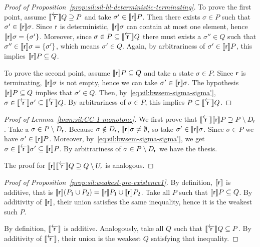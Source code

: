 \begin{proof}[Proof of Proposition~\ref{prop:sil:sil-hl-deterministic-terminating}]
	To prove the first point, assume $\llbracket\overleftarrow{\mathsf{r}}\rrbracket Q \supseteq P$ and take $\sigma' \in \llbracket\mathsf{r}\rrbracket P$. Then there exists $\sigma \in P$ such that $\sigma' \in \llbracket\mathsf{r}\rrbracket \sigma$. Since $\mathsf{r}$ is deterministic, $\llbracket\mathsf{r}\rrbracket \sigma$ can contain at most one element, hence $\llbracket\mathsf{r}\rrbracket \sigma = \{ \sigma' \}$. Moreover, since $\sigma \in P \subseteq \llbracket\overleftarrow{\mathsf{r}}\rrbracket Q$ there must exists a $\sigma'' \in Q$ such that $\sigma'' \in \llbracket\mathsf{r}\rrbracket \sigma = \{ \sigma' \}$, which means $\sigma' \in Q$. Again, by arbitrariness of $\sigma' \in \llbracket\mathsf{r}\rrbracket P$, this implies $\llbracket\mathsf{r}\rrbracket P \subseteq Q$.

	To prove the second point, assume $\llbracket\mathsf{r}\rrbracket P \subseteq Q$ and take a state $\sigma \in P$. Since $\mathsf{r}$ is terminating, $\llbracket\mathsf{r}\rrbracket \sigma$ is not empty, hence we can take $\sigma' \in \llbracket\mathsf{r}\rrbracket \sigma$. The hypothesis $\llbracket\mathsf{r}\rrbracket P \subseteq Q$ implies that $\sigma' \in Q$. Then, by~\eqref{eq:sil:bwsem-sigma-sigma'}, $\sigma \in \llbracket\overleftarrow{\mathsf{r}}\rrbracket \sigma' \subseteq \llbracket\overleftarrow{\mathsf{r}}\rrbracket Q$. By arbitrariness of $\sigma \in P$, this implies $P \subseteq \llbracket\overleftarrow{\mathsf{r}}\rrbracket Q$.
\end{proof}

\begin{proof}[Proof of Lemma~\ref{lmm:sil:CC-1-monotone}]
	We first prove that $\llbracket\overleftarrow{\mathsf{r}}\rrbracket \llbracket\mathsf{r}\rrbracket P \supseteq P \setminus D_{\mathsf{r}}$.
	Take a $\sigma \in P \setminus D_{\mathsf{r}}$. Because $\sigma \notin D_{\mathsf{r}}$, $\llbracket\mathsf{r}\rrbracket \sigma \neq \emptyset$, so take $\sigma' \in \llbracket\mathsf{r}\rrbracket \sigma$. Since $\sigma \in P$ we have $\sigma' \in \llbracket\mathsf{r}\rrbracket P$. Moreover, by~\eqref{eq:sil:bwsem-sigma-sigma'}, we get $\sigma \in \llbracket\overleftarrow{\mathsf{r}}\rrbracket \sigma' \subseteq \llbracket\mathsf{r}\rrbracket P$. By arbitrariness of $\sigma \in P \setminus D_{\mathsf{r}}$ we have the thesis.

	The proof for $\llbracket\mathsf{r}\rrbracket \llbracket\overleftarrow{\mathsf{r}}\rrbracket Q \supseteq Q \setminus U_{\mathsf{r}}$ is analogous.
\end{proof}

\begin{proof}[Proof of Proposition~\ref{prop:sil:weakest-pre-existence1}]
	By definition, $\llbracket\mathsf{r}\rrbracket$ is additive, that is $\llbracket\mathsf{r}\rrbracket(P_1 \cup P_2) = \llbracket\mathsf{r}\rrbracket P_1 \cup \llbracket\mathsf{r}\rrbracket P_2$. Take all $P$ such that $\llbracket\mathsf{r}\rrbracket P \subseteq Q$. By additivity of $\llbracket\mathsf{r}\rrbracket$, their union satisfies the same inequality, hence it is the weakest such $P$.

	By definition, $\llbracket\overleftarrow{\mathsf{r}}\rrbracket$ is additive. Analogously, take all $Q$ such that $\llbracket\overleftarrow{\mathsf{r}}\rrbracket Q \subseteq P$. By additivity of $\llbracket\overleftarrow{\mathsf{r}}\rrbracket$, their union is the weakest $Q$ satisfying that inequality.
\end{proof}


